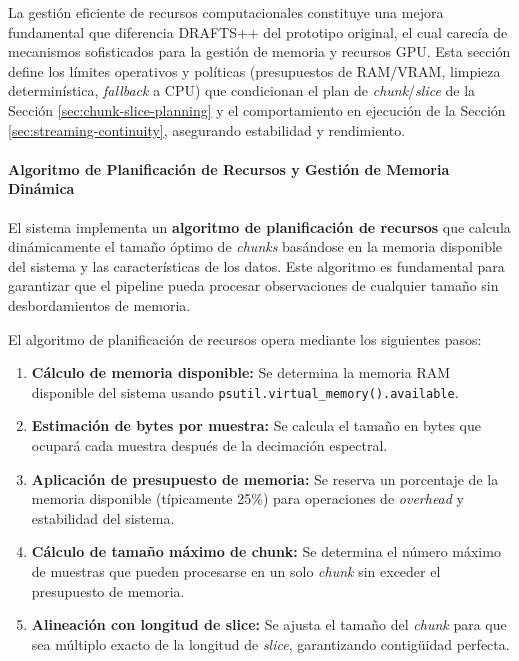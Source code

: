 La gestión eficiente de recursos computacionales constituye una mejora fundamental que diferencia DRAFTS++ del prototipo original, el cual carecía de mecanismos sofisticados para la gestión de memoria y recursos GPU. Esta sección define los límites operativos y políticas (presupuestos de RAM/VRAM, limpieza determinística, \textit{fallback} a CPU) que condicionan el plan de \emph{chunk}/\emph{slice} de la Sección \ref{sec:chunk-slice-planning} y el comportamiento en ejecución de la Sección \ref{sec:streaming-continuity}, asegurando estabilidad y rendimiento.

\paragraph{Algoritmo de Planificación de Recursos y Gestión de Memoria Dinámica}

El sistema implementa un \textbf{algoritmo de planificación de recursos} que calcula dinámicamente el tamaño óptimo de \emph{chunks} basándose en la memoria disponible del sistema y las características de los datos. Este algoritmo es fundamental para garantizar que el pipeline pueda procesar observaciones de cualquier tamaño sin desbordamientos de memoria.

El algoritmo de planificación de recursos opera mediante los siguientes pasos:

\begin{enumerate}
    \item \textbf{Cálculo de memoria disponible:} Se determina la memoria RAM disponible del sistema usando \texttt{psutil.virtual\_memory().available}.
    \item \textbf{Estimación de bytes por muestra:} Se calcula el tamaño en bytes que ocupará cada muestra después de la decimación espectral.
    \item \textbf{Aplicación de presupuesto de memoria:} Se reserva un porcentaje de la memoria disponible (típicamente 25\%) para operaciones de \emph{overhead} y estabilidad del sistema.
    \item \textbf{Cálculo de tamaño máximo de chunk:} Se determina el número máximo de muestras que pueden procesarse en un solo \emph{chunk} sin exceder el presupuesto de memoria.
    \item \textbf{Alineación con longitud de slice:} Se ajusta el tamaño del \emph{chunk} para que sea múltiplo exacto de la longitud de \emph{slice}, garantizando contigüidad perfecta.
\end{enumerate}

